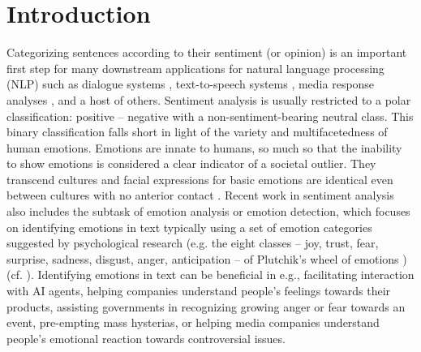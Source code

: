
\chapter{Introduction} %

\label{ch:introduction} %


Categorizing sentences according to their sentiment (or opinion) is an important first step for many downstream applications for natural language processing (NLP) such as dialogue systems \cite{dialogue_systems}, text-to-speech systems \cite{text-to-speech}, media response analyses \cite{media_response_analysis}, and a host of others. Sentiment analysis is usually restricted to a polar classification: positive -- negative with a non-sentiment-bearing neutral class. This binary classification falls short in light of the variety and multifacetedness of human emotions. Emotions are innate to humans, so much so that the inability to show emotions is considered a clear indicator of a societal outlier. They transcend cultures and facial expressions for basic emotions are identical even between cultures with no anterior contact \cite{facial_expressions}.
Recent work in sentiment analysis also includes the subtask of emotion analysis or emotion detection, which focuses on identifying emotions in text typically using a set of emotion categories suggested by psychological research (e.g. the eight classes -- joy, trust, fear, surprise, sadness, disgust, anger, anticipation -- of Plutchik's wheel of emotions \cite{plutchik}) (cf. \cite{nrc}). Identifying emotions in text can be beneficial in e.g., facilitating interaction with AI agents, helping companies understand people's feelings towards their products, assisting governments in recognizing growing anger or fear towards an event, pre-empting mass hysterias, or helping media companies understand people's emotional reaction towards controversial issues.

